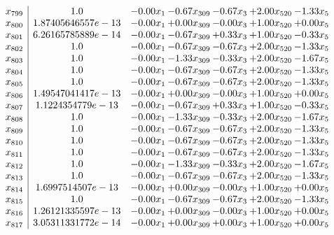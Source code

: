 \documentclass[8pt]{article}
\begin{document}
\[\begin{array}{c| c c@{\hskip 2pt} c@{\hskip 2pt} c@{\hskip 2pt} c@{\hskip 2pt} c@{\hskip 2pt} }
 x_{799}   &  1.0 & -0.00 x_{1} & -0.67 x_{309} & -0.67 x_{3} & +  2.00 x_{520} & -1.33 x_{5}\\
 x_{800}   &  1.87405646557e-13 & -0.00 x_{1} & +  0.00 x_{309} & -0.00 x_{3} & +  1.00 x_{520} & +  0.00 x_{5}\\
 x_{801}   &  6.26165785889e-14 & -0.00 x_{1} & -0.67 x_{309} & +  0.33 x_{3} & +  1.00 x_{520} & -0.33 x_{5}\\
 x_{802}   &  1.0 & -0.00 x_{1} & -0.67 x_{309} & -0.67 x_{3} & +  2.00 x_{520} & -1.33 x_{5}\\
 x_{803}   &  1.0 & -0.00 x_{1} & -1.33 x_{309} & -0.33 x_{3} & +  2.00 x_{520} & -1.67 x_{5}\\
 x_{804}   &  1.0 & -0.00 x_{1} & -0.67 x_{309} & -0.67 x_{3} & +  2.00 x_{520} & -1.33 x_{5}\\
 x_{805}   &  1.0 & -0.00 x_{1} & -0.67 x_{309} & -0.67 x_{3} & +  2.00 x_{520} & -1.33 x_{5}\\
 x_{806}   &  1.49547041417e-13 & -0.00 x_{1} & +  0.00 x_{309} & -0.00 x_{3} & +  1.00 x_{520} & +  0.00 x_{5}\\
 x_{807}   &  1.1224354779e-13 & -0.00 x_{1} & -0.67 x_{309} & +  0.33 x_{3} & +  1.00 x_{520} & -0.33 x_{5}\\
 x_{808}   &  1.0 & -0.00 x_{1} & -1.33 x_{309} & -0.33 x_{3} & +  2.00 x_{520} & -1.67 x_{5}\\
 x_{809}   &  1.0 & -0.00 x_{1} & -0.67 x_{309} & -0.67 x_{3} & +  2.00 x_{520} & -1.33 x_{5}\\
 x_{810}   &  1.0 & -0.00 x_{1} & -0.67 x_{309} & -0.67 x_{3} & +  2.00 x_{520} & -1.33 x_{5}\\
 x_{811}   &  1.0 & -0.00 x_{1} & -0.67 x_{309} & -0.67 x_{3} & +  2.00 x_{520} & -1.33 x_{5}\\
 x_{812}   &  1.0 & -0.00 x_{1} & -1.33 x_{309} & -0.33 x_{3} & +  2.00 x_{520} & -1.67 x_{5}\\
 x_{813}   &  1.0 & -0.00 x_{1} & -0.67 x_{309} & -0.67 x_{3} & +  2.00 x_{520} & -1.33 x_{5}\\
 x_{814}   &  1.6997514507e-13 & -0.00 x_{1} & +  0.00 x_{309} & -0.00 x_{3} & +  1.00 x_{520} & +  0.00 x_{5}\\
 x_{815}   &  1.0 & -0.00 x_{1} & -0.67 x_{309} & -0.67 x_{3} & +  2.00 x_{520} & -1.33 x_{5}\\
 x_{816}   &  1.26121335597e-13 & -0.00 x_{1} & +  0.00 x_{309} & -0.00 x_{3} & +  1.00 x_{520} & +  0.00 x_{5}\\
 x_{817}   &  3.05311331772e-14 & -0.00 x_{1} & +  0.00 x_{309} & +  0.00 x_{3} & +  1.00 x_{520} & +  0.00 x_{5}\\

\end{array}\]
\end{document}
